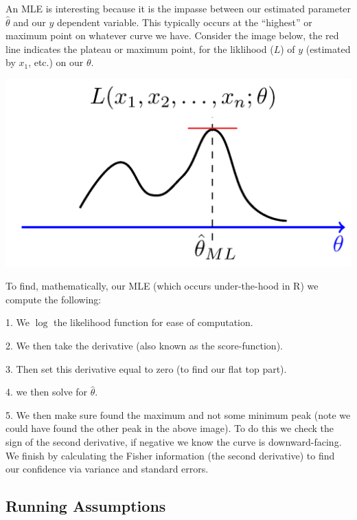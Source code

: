 \documentclass[12pt]{article}\usepackage[]{graphicx}\usepackage[]{color}
\begin{document}
\begin{flushleft}
An MLE is interesting because it is the impasse between our estimated parameter $\hat{\theta}$ and our $y$ dependent variable. This typically occurs at the ``highest'' or maximum point on whatever curve we have. Consider the image below, the red line indicates the plateau or maximum point, for the liklihood ($L$) of $y$ (estimated by $x_1$, etc.) on our $\theta$.

\begin{center}
\includegraphics[scale=2]{MLEex}
\end{center}

\clearpage

To find, mathematically, our MLE (which occurs under-the-hood in R) we compute the following: 

\begin{list}{}{}
\item[1.] We $\log$ the likelihood function for ease of computation.
\item[2.] We then take the derivative (also known as the score-function).
\item[3.] Then set this derivative equal to zero (to find our flat top part).
\item[4.] we then solve for $\hat{\theta}$.
\item[5.] We then make sure found the maximum and not some minimum peak (note we could have found the other peak in the above image). To do this we check the sign of the second derivative, if negative we know the curve is downward-facing. We finish by calculating the Fisher information (the second derivative) to find our confidence via variance and standard errors.
\end{list}





\subsection{Running Assumptions}


\end{flushleft}
\end{document}

